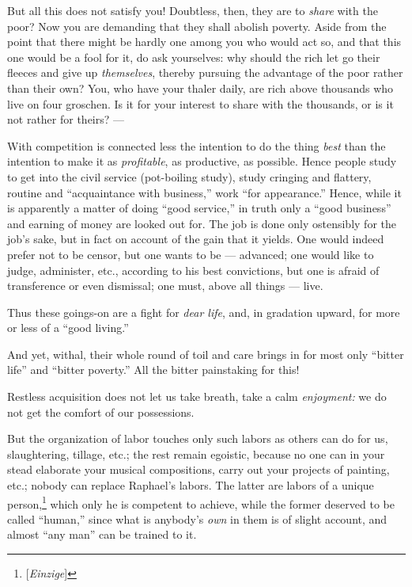 But all this does not satisfy you! Doubtless, then, they are to \textit{share} 
with the poor? Now you are demanding that they shall abolish poverty. Aside 
from the point that there might be hardly one among you who would act so, and 
that this one would be a fool for it, do ask yourselves: why should the rich 
let go their fleeces and give up \textit{themselves}, thereby pursuing the 
advantage of the poor rather than their own? You, who have your thaler daily, 
are rich above thousands who live on four groschen. Is it for your interest to 
share with the thousands, or is it not rather for theirs? ---

With competition is connected less the intention to do the thing \textit{best} 
than the intention to make it as \textit{profitable}, as productive, as 
possible. Hence people study to get into the civil service (pot-boiling 
study), study cringing and flattery, routine and ``acquaintance with 
business,'' work ``for appearance.'' Hence, while it is apparently a matter 
of doing ``good service,'' in truth only a ``good business'' and earning 
of money are looked out for. The job is done only ostensibly for the job's 
sake, but in fact on account of the gain that it yields. One would indeed 
prefer not to be censor, but one wants to be --- advanced; one would like to 
judge, administer, etc., according to his best convictions, but one is afraid 
of transference or even dismissal; one must, above all things --- live.

Thus these goings-on are a fight for \textit{dear life}, and, in gradation 
upward, for more or less of a ``good living.''

And yet, withal, their whole round of toil and care brings in for most only 
``bitter life'' and ``bitter poverty.'' All the bitter painstaking for 
this!

Restless acquisition does not let us take breath, take a calm 
\textit{enjoyment:} we do not get the comfort of our possessions.

But the organization of labor touches only such labors as others can do for 
us, slaughtering, tillage, etc.; the rest remain egoistic, because no one can 
in your stead elaborate your musical compositions, carry out your projects of 
painting, etc.; nobody can replace Raphael's labors. The latter are labors of 
a unique person,\footnote{[\textit{Einzige}]} which only he is competent to 
achieve, while the former deserved to be called ``human,'' since what is 
anybody's \textit{own} in them is of slight account, and almost ``any man'' 
can be trained to it.

